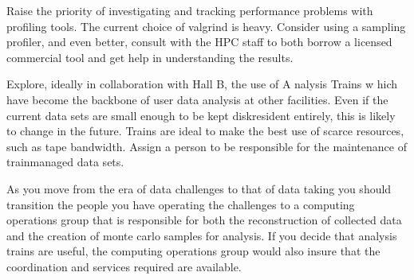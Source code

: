 \documentclass[12pt]{article}
\begin{document}
Raise the priority of investigating and tracking performance problems with profiling tools. The current choice of valgrind is heavy. Consider using a sampling profiler, and even better, consult with the HPC staff to both borrow a licensed commercial tool and get help in understanding the results.

Explore, ideally in collaboration with Hall B, the use of A nalysis Trains w hich have become the backbone of user data analysis at other facilities. Even if the current data sets are small enough to be kept disk­resident entirely, this is likely to change in the future. Trains are ideal to make the best use of scarce resources, such as tape bandwidth. Assign a person to be responsible for the maintenance of train­managed data sets. 

As you move from the era of data challenges to that of data taking you should transition the people you have operating the challenges to a computing operations group that is responsible for both the reconstruction of collected data and the creation of monte carlo samples for analysis. If you decide that analysis trains are useful, the computing operations group would also insure that the coordination and services required are available. 
\end{document}

